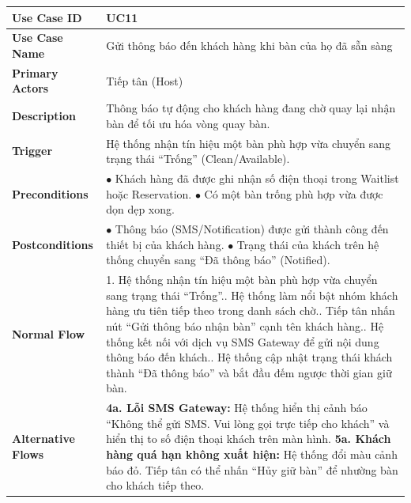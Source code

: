 \begin{longtable}{|p{3.5cm}|p{12.5cm}|}
\hline
\textbf{Use Case ID} & UC11 \\ \hline
\textbf{Use Case Name} & Gửi thông báo đến khách hàng khi bàn của họ đã sẵn sàng \\ \hline
\textbf{Primary Actors} & Tiếp tân (Host) \\ \hline
\textbf{Description} & Thông báo tự động cho khách hàng đang chờ quay lại nhận bàn để tối ưu hóa vòng quay bàn. \\ \hline
\textbf{Trigger} & Hệ thống nhận tín hiệu một bàn phù hợp vừa chuyển sang trạng thái ``Trống'' (Clean/Available). \\ \hline
\textbf{Preconditions} &
$\bullet$ Khách hàng đã được ghi nhận số điện thoại trong Waitlist hoặc Reservation.\newline
$\bullet$ Có một bàn trống phù hợp vừa được dọn dẹp xong. \\ \hline
\textbf{Postconditions} &
$\bullet$ Thông báo (SMS/Notification) được gửi thành công đến thiết bị của khách hàng.\newline
$\bullet$ Trạng thái của khách trên hệ thống chuyển sang ``Đã thông báo'' (Notified). \\ \hline
\textbf{Normal Flow} &
1. Hệ thống nhận tín hiệu một bàn phù hợp vừa chuyển sang trạng thái ``Trống''.\newline
2. Hệ thống làm nổi bật nhóm khách hàng ưu tiên tiếp theo trong danh sách chờ.\newline
3. Tiếp tân nhấn nút ``Gửi thông báo nhận bàn'' cạnh tên khách hàng.\newline
4. Hệ thống kết nối với dịch vụ SMS Gateway để gửi nội dung thông báo đến khách.\newline
5. Hệ thống cập nhật trạng thái khách thành ``Đã thông báo'' và bắt đầu đếm ngược thời gian giữ bàn. \\ \hline
\textbf{Alternative Flows} &
\textbf{4a. Lỗi SMS Gateway:} Hệ thống hiển thị cảnh báo ``Không thể gửi SMS. Vui lòng gọi trực tiếp cho khách'' và hiển thị to số điện thoại khách trên màn hình.\newline
\textbf{5a. Khách hàng quá hạn không xuất hiện:} Hệ thống đổi màu cảnh báo đỏ. Tiếp tân có thể nhấn ``Hủy giữ bàn'' để nhường bàn cho khách tiếp theo. \\ \hline
\end{longtable}

